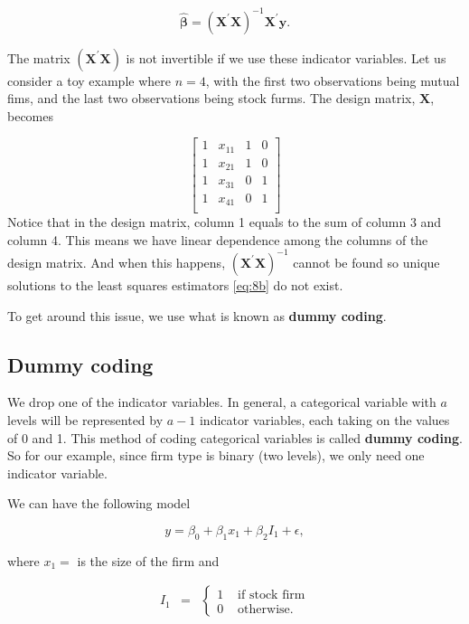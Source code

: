 \documentclass[
]{book}
\begin{document}
\begin{equation} 
\boldsymbol{\hat{\beta}}   =
\left(\boldsymbol{X}^{\prime} \boldsymbol{X} \right)^{-1} \boldsymbol{X}^{\prime} \boldsymbol{y} .
\label{eq:8b}
\end{equation}

The matrix \((\boldsymbol{X}^{\prime} \boldsymbol{X})\) is not invertible if we use these indicator variables. Let us consider a toy example where \(n=4\), with the first two observations being mutual fims, and the last two observations being stock furms. The design matrix, \(\boldsymbol{X}\), becomes

\[
\left[
\begin{array}{cccc}
   1 & x_{11} & 1 & 0   \\
   1 & x_{21} & 1 & 0    \\
   1 & x_{31} & 0 & 1   \\
   1 & x_{41} & 0 & 1    \\
\end{array}
\right]
\]
Notice that in the design matrix, column 1 equals to the sum of column 3 and column 4. This means we have linear dependence among the columns of the design matrix. And when this happens, \((\boldsymbol{X}^{\prime} \boldsymbol{X})^{-1}\) cannot be found so unique solutions to the least squares estimators \eqref{eq:8b} do not exist.

To get around this issue, we use what is known as \textbf{dummy coding}.

\hypertarget{dummy-coding}{%
\subsection{Dummy coding}\label{dummy-coding}}

We drop one of the indicator variables. In general, a categorical variable with \(a\) levels will be represented by \(a-1\) indicator variables, each taking on the values of 0 and 1. This method of coding categorical variables is called \textbf{dummy coding}. So for our example, since firm type is binary (two levels), we only need one indicator variable.

We can have the following model

\begin{equation} 
y = \beta_0 + \beta_1x_{1} + \beta_2I_{1} +
\epsilon,
\label{eq:8additive}
\end{equation}

where \(x_1=\) is the size of the firm and

\begin{eqnarray*}
I_1 &=& \left\{ \begin{array}{ll} 1 & \mbox{ if stock firm} \\ 0 &
\mbox{ otherwise.} \end{array}\right.
\end{eqnarray*}
\end{document}
